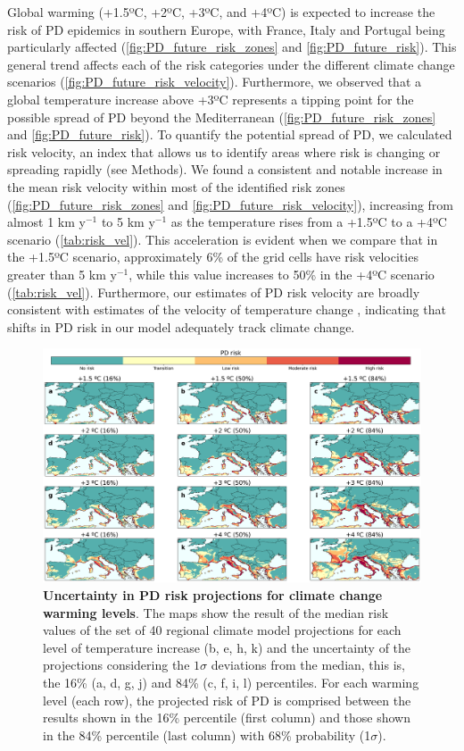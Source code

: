 Global warming (+1.5ºC, +2ºC, +3ºC, and +4ºC) is expected to increase the
risk of PD epidemics in southern Europe, with France, Italy and Portugal being
particularly affected (\cref{fig:PD_future_risk_zones} and
\cref{fig:PD_future_risk}). This general trend affects each of the risk
categories under the different climate change scenarios
(\cref{fig:PD_future_risk_velocity}). Furthermore, we observed that a global
temperature increase above +3ºC represents a tipping point for the possible
spread of PD beyond the Mediterranean (\cref{fig:PD_future_risk_zones} and
\cref{fig:PD_future_risk}). To quantify the potential spread of PD, we
calculated risk velocity, an index that allows us to identify areas where risk
is changing  or spreading rapidly (see Methods). We found a consistent and
notable increase in the mean risk velocity within most of the identified risk
zones (\cref{fig:PD_future_risk_zones} and \cref{fig:PD_future_risk_velocity}),
increasing from almost 1 km y$^{-1}$ to 5
km y$^{-1}$ as the temperature rises from a +1.5ºC to a +4ºC scenario
(\cref{tab:risk_vel}). This acceleration is evident when we
compare that in
the +1.5ºC scenario, approximately 6\% of the grid cells have risk velocities
greater than 5 km y$^{\mathrm{-1}}$, while this value increases to 50\% in the
+4ºC scenario (\cref{tab:risk_vel}). Furthermore, our estimates of
PD risk
velocity are broadly consistent with estimates of the velocity of temperature
change \cite{Loarie2009}, indicating that shifts in PD risk in our model
adequately track climate change.

\begin{figure}[H]
    \centering
    \includegraphics[width=\textwidth]{Figures/Uncertainty.png}
    \caption{\textbf{Uncertainty in PD risk projections for climate change
            warming levels}. The maps show the result of the median risk values
        of the set
        of 40 regional climate model projections for each level of temperature
        increase
        (b, e, h, k) and the uncertainty of the projections considering the $1
            \sigma$
        deviations from the median, this is, the 16\% (a, d, g, j) and 84\% (c,
        f, i,
        l) percentiles. For each warming level (each row), the projected risk
        of PD is
        comprised between the results shown in the 16\% percentile (first
        column) and
        those shown in the 84\% percentile (last column) with 68\% probability
        (1$\sigma$).}
    \label{fig:uncertainty}
\end{figure}

